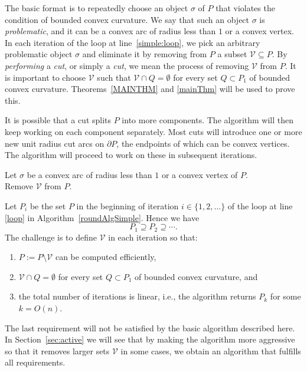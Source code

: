 \documentclass{article}
\newcommand{\ttt}[1]{\texttt{#1}}
\newcommand{\PP}{P}
\newcommand{\QQ}{Q}
\newcommand{\se}{\sigma}
\newcommand{\VV}{\mathcal V}
\newcommand{\mydef}{:=}
\begin{document}
The basic format is to repeatedly choose an object $\se$ of $\PP$ that violates the condition of bounded convex curvature.
We say that such an object $\se$ is \emph{problematic}, and it can be a convex arc of radius less than $1$ or a convex vertex. 
In each iteration of the loop at line~\ref{simple:loop}, we pick an arbitrary problematic object $\se$ and eliminate it by removing from $\PP$ a subset $\VV\subseteq \PP$.
By \emph{performing} a \emph{cut}, or simply a \emph{cut}, we mean the process of removing $\VV$ from $\PP$.
It is important to choose $\VV$ such that $\VV\cap\QQ=\emptyset$ for every set $\QQ\subset\PP_1$ of bounded convex curvature.
Theorems~\ref{MAINTHM} and \ref{mainThm} will be used to prove this.

It is possible that a cut splits $\PP$ into more components.
The algorithm will then keep working on each component separately.
Most cuts will introduce one or more new unit radius cut arcs on $\partial \PP$, the endpoints of which can be convex vertices.
The algorithm will proceed to work on these in subsequent iterations.

\begin{algorithm}[h]
\LinesNumbered
\DontPrintSemicolon
\SetArgSty{}
\While {$\PP$ does not have bounded convex curvature} {\label{simple:loop}
  Let $\se$ be a convex arc of radius less than $1$ or a convex vertex of $\PP$. \\
  Remove $\VV$ from $\PP$. \\
}
\Return {$\PP$}
\caption{$\ttt{BasicBoundedConvexCurvature}(\PP)$}
\label{roundAlgSimple}
\end{algorithm}

Let $\PP_i$ be the set $\PP$ in the beginning of iteration $i\in\{1,2,\ldots\}$ of the loop at line \ref{loop} in Algorithm~\ref{roundAlgSimple}.
Hence we have
\[
\PP_1\supseteq\PP_2\supseteq\cdots.
\]
The challenge is to define $\VV$ in each iteration so that:
\begin{enumerate}
\item
$\PP\mydef\PP\setminus\VV$ can be computed efficiently,
\item
$\VV\cap\QQ=\emptyset$ for every set $\QQ\subset\PP_1$ of bounded convex curvature, and
\item
the total number of iterations is linear, i.e., the algorithm returns $\PP_k$ for some $k=O(n)$.
\end{enumerate}
The last requirement will not be satisfied by the basic algorithm described here.
In Section~\ref{sec:active} we will see that by making the algorithm more aggressive so that it removes larger sets $\VV$ in some cases, we obtain an algorithm that fulfills all requirements.
\end{document}
